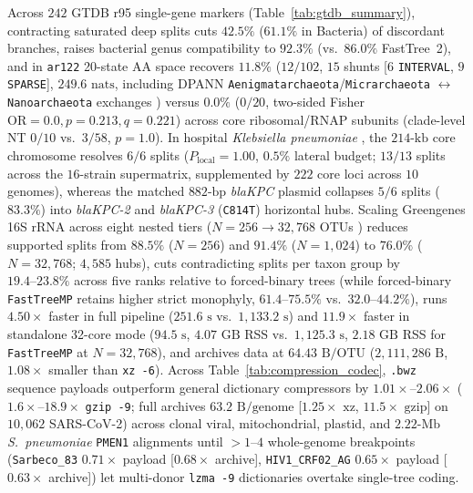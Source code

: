 \documentclass[12pt]{article}
\begin{document}
Across $242$ GTDB r95 single-gene markers \cite{parks2018gtdb,parks2020gtdb} (Table~\ref{tab:gtdb_summary}), contracting saturated deep splits cuts $42.5\%$ ($61.1\%$ in Bacteria) of discordant branches, raises bacterial genus compatibility to $92.3\%$ (vs.\ $86.0\%$ FastTree~2), and in \texttt{ar122} 20-state AA space recovers $11.8\%$ ($12/102$, $15$ shunts [$6$ \texttt{INTERVAL}, $9$ \texttt{SPARSE}], $249.6\text{ nats}$, including DPANN \texttt{Aenigmatarchaeota}/\texttt{Micrarchaeota} $\leftrightarrow$ \texttt{Nanoarchaeota} exchanges \cite{castelle2018major}) versus $0.0\%$ ($0/20$, two-sided Fisher $\text{OR}=0.0, p = 0.213, q = 0.221$) across core ribosomal/RNAP subunits \cite{jain1999horizontal,woese2000aminoacyl} (clade-level NT $0/10$ vs.\ $3/58$, $p = 1.0$). In hospital \textit{Klebsiella pneumoniae} \cite{wyres2020population}, the $214\text{-kb}$ core chromosome resolves $6/6$ splits ($P_{\text{local}}=1.00$, $0.5\%$ lateral budget; $13/13$ splits across the $16$-strain supermatrix, supplemented by $222$ core loci across $10$ genomes), whereas the matched $882\text{-bp}$ \textit{blaKPC} plasmid collapses $5/6$ splits ($83.3\%$) into \textit{blaKPC-2} and \textit{blaKPC-3} (\texttt{C814T}) horizontal hubs. Scaling Greengenes 16S rRNA across eight nested tiers ($N = 256 \to 32,768$ OTUs \cite{mcdonald2012greengenes}) reduces supported splits from $88.5\%$ ($N=256$) and $91.4\%$ ($N=1,024$) to $76.0\%$ ($N=32,768$; $4,585$ hubs), cuts contradicting splits per taxon group by $19.4\text{--}23.8\%$ across five ranks relative to forced-binary trees (while forced-binary \texttt{FastTreeMP} retains higher strict monophyly, $61.4\text{--}75.5\%$ vs.\ $32.0\text{--}44.2\%$), runs $4.50\times$ faster in full pipeline ($251.6\text{ s}$ vs.\ $1,133.2\text{ s}$) and $11.9\times$ faster in standalone 32-core mode ($94.5\text{ s}$, $4.07\text{ GB}$ RSS vs.\ $1,125.3\text{ s}$, $2.18\text{ GB}$ RSS for \texttt{FastTreeMP} at $N=32,768$), and archives data at $64.43\text{ B/OTU}$ ($2,111,286\text{ B}$, $1.08\times$ smaller than \texttt{xz -6}). Across Table~\ref{tab:compression_codec}, \texttt{.bwz} sequence payloads outperform general dictionary compressors by $1.01\times\text{--}2.06\times$ ($1.6\times\text{--}18.9\times$ \texttt{gzip -9}; full archives $63.2\text{ B/genome}$ [$1.25\times\text{ xz}$, $11.5\times\text{ gzip}$] on $10,062$ SARS-CoV-2) across clonal viral, mitochondrial, plastid, and $2.22\text{-Mb}$ \textit{S.\ pneumoniae} \texttt{PMEN1} \cite{croucher2011rapid,dowson1989horizontal} alignments until $>1\text{--}4$ whole-genome breakpoints (\texttt{Sarbeco\_83} $0.71\times$ payload [$0.68\times$ archive], \texttt{HIV1\_CRF02\_AG} $0.65\times$ payload [$0.63\times$ archive]) let multi-donor \texttt{lzma -9} dictionaries \cite{li2003modeling} overtake single-tree coding.
\end{document}
